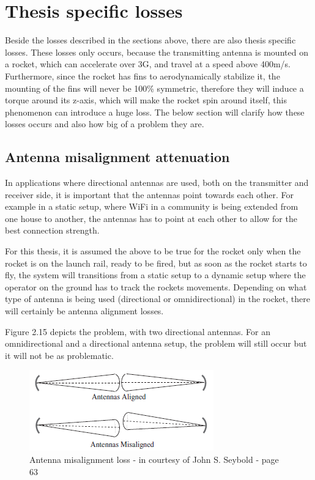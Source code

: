 \newpage

\section{Thesis specific losses}
Beside the losses described in the sections above, there are also thesis specific losses. These losses only occurs, because the transmitting antenna is mounted on a rocket, which can accelerate over 3G, and travel at a speed above 400m/s. Furthermore, since the rocket has fins to aerodynamically stabilize it, the mounting of the fins will never be 100\% symmetric, therefore they will induce a torque around its z-axis, which will make the rocket spin around itself, this phenomenon can introduce a huge loss. The below section will clarify how these losses occurs and also how big of a problem they are.

\subsection{Antenna misalignment attenuation}
In applications where directional antennas are used, both on the transmitter and receiver side, it is important that the antennas point towards each other. For example in a static setup, where WiFi in a community is being extended from one house to another, the antennas has to point at each other to allow for the best connection strength.  

For this thesis, it is assumed the above to be true for the rocket only when the rocket is on the launch rail, ready to be fired, but as soon as the rocket starts to fly, the system will transitions from a static setup to a dynamic setup where the operator on the ground has to track the rockets movements. Depending on what type of antenna is being used (directional or omnidirectional) in the rocket, there will certainly be antenna alignment losses.

Figure 2.15 depicts the problem, with two directional antennas. For an omnidirectional and a directional antenna setup, the problem will still occur but it will not be as problematic. %

\begin{figure}[h]
\centering
\includegraphics[scale=1]{figures/AntennasAlignment.PNG}
\caption{Antenna misalignment loss - in courtesy of John S. Seybold  \cite{RFpropagation} - page 63}
\end{figure}

